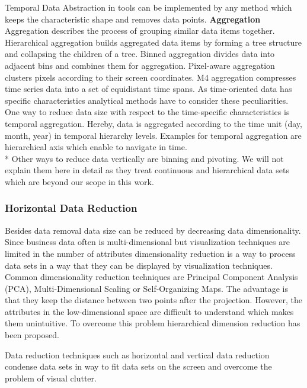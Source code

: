Temporal Data Abstraction in tools can be implemented by any method which keeps the characteristic shape and removes data points. 
\textbf*{Aggregation}
Aggregation describes the process of grouping similar data items together. Hierarchical aggregation builds aggregated data items by forming a tree structure and collapsing the children of a tree\cite{elmqvist2010hierarchical}. Binned aggregation divides data into adjacent bins and combines them for aggregation\cite{Liu2013}. Pixel-aware aggregation clusters pixels according to their screen coordinates\cite{li2016polyspector}. M4 aggregation compresses time series data into a set of equidistant time spans\cite{jugel2014m4}.
As time-oriented data has specific characteristics analytical methods have to consider these peculiarities. One way to reduce data size with respect to the time-specific characteristics is temporal aggregation. Hereby, data is aggregated according to the time unit (day, month, year) in temporal hierarchy levels. Examples for temporal aggregation are hierarchical axis \cite{Chung2014} which enable to navigate in time. 
\\*
Other ways to reduce data vertically are binning and pivoting. We will not explain them here in detail as they treat continuous and hierarchical data sets which are beyond our scope in this work. 

\subsubsection{Horizontal Data Reduction}
Besides data removal data size can be reduced by decreasing data dimensionality. Since business data often is multi-dimensional but visualization techniques are limited in the number of attributes dimensionality reduction is a way to process data sets in a way that they can be displayed by visualization techniques. 
Common dimensionality reduction techniques are Principal Component Analysis (PCA)\cite{Aigner2008}, Multi-Dimensional Scaling or  Self-Organizing Maps\cite{PiringerHarald2011}. The advantage is that they keep the distance between two points after the projection. However, the attributes in the low-dimensional space are difficult to understand which makes them unintuitive. To overcome this problem hierarchical dimension reduction has been proposed. 

Data reduction techniques such as horizontal and vertical data reduction condense  data sets in way to fit data sets on the screen and overcome the problem of visual clutter.

